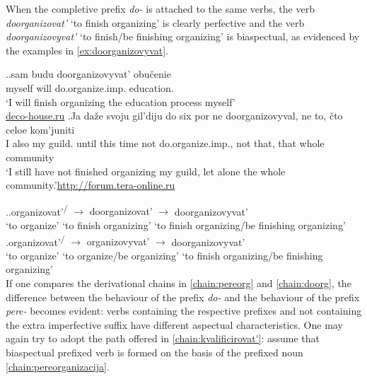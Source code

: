When the completive  prefix \textit{do-}   is attached to the same verbs, the verb \textit{doorganizovat'} `to finish organizing' is clearly perfective and the verb \textit{doorganizovyvat'} `to finish/be finishing organizing' is biaspectual, as evidenced by the examples in \ref{ex:doorganizovyvat}.

\ex.\label{ex:doorganizovyvat}\ag.sam budu doorganizovyvat'\textsuperscript{\IPF} obu\v{c}enie\\
myself will do.organize.imp. education.\\
\trans `I will finish organizing the education process myself'\\\hbox{}\hfill\hbox{\url{deco-house.ru}}
\bg.Ja da\v{z}e svoju gil'diju do six por ne doorganizovyval\textsuperscript{\PF}, ne to, \v{c}to celoe kom'juniti\\
I also my guild. until this time not do.organize.imp., not that, that whole community\\
\trans `I still have not finished organizing my guild, let alone the whole community.'\hbox{}\hfill\hbox{\url{http://forum.tera-online.ru}}

\ex.\label{chain:doorg}\ag.organizovat'\textsuperscript{\PF\slash\IPF} {$\rightarrow$} {doorganizovat'\textsuperscript{\PF}} {$\rightarrow$} doorganizovyvat'\textsuperscript{\IPF}\\
{`to organize'} {} {`to finish organizing'} {} {`to finish organizing/be finishing organizing'}\\
\bg.organizovat'\textsuperscript{\PF\slash\IPF} {$\rightarrow$} {organizovyvat'\textsuperscript{\IPF}} {$\rightarrow$} doorganizovyvat'\textsuperscript{\PF}\\
{`to organize'} {} {`to organize/be organizing'} {} {`to finish organizing/be finishing organizing'}\\

If one compares the derivational chains in \ref{chain:pereorg} and \ref{chain:doorg}, the difference between the behaviour of the prefix \textit{do-}   and the behaviour of the prefix \textit{pere-}   becomes evident: verbs containing the respective prefixes and not containing the extra imperfective suffix   have different aspectual characteristics. One may again try to adopt the path offered in \ref{chain:kvalificirovat'}: assume that biaspectual prefixed verb is formed on the basis of the prefixed noun  \ref{chain:pereorganizacija}.
 
